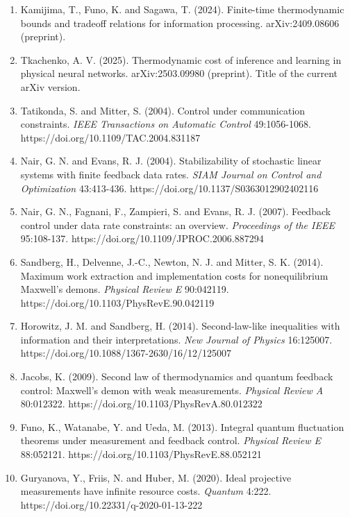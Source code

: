 \documentclass[
  10pt,
]{article}
\newcounter{none} %
\begin{document}
\begin{enumerate}
  Rolandi, A. and Perarnau-Llobet, M. (2023). Finite-time Landauer
  principle beyond weak coupling. \emph{Quantum} 7:1161.
  https://doi.org/10.22331/q-2023-11-03-1161
\item
  Kamijima, T., Funo, K. and Sagawa, T. (2024). Finite-time
  thermodynamic bounds and tradeoff relations for information
  processing. arXiv:2409.08606 (preprint).
\item
  Tkachenko, A. V. (2025). Thermodynamic cost of inference and learning
  in physical neural networks. arXiv:2503.09980 (preprint). Title of the
  current arXiv version.
\item
  Tatikonda, S. and Mitter, S. (2004). Control under communication
  constraints. \emph{IEEE Transactions on Automatic Control}
  49:1056-1068. https://doi.org/10.1109/TAC.2004.831187
\item
  Nair, G. N. and Evans, R. J. (2004). Stabilizability of stochastic
  linear systems with finite feedback data rates. \emph{SIAM Journal on
  Control and Optimization} 43:413-436.
  https://doi.org/10.1137/S0363012902402116
\item
  Nair, G. N., Fagnani, F., Zampieri, S. and Evans, R. J. (2007).
  Feedback control under data rate constraints: an overview.
  \emph{Proceedings of the IEEE} 95:108-137.
  https://doi.org/10.1109/JPROC.2006.887294
\item
  Sandberg, H., Delvenne, J.-C., Newton, N. J. and Mitter, S. K. (2014).
  Maximum work extraction and implementation costs for nonequilibrium
  Maxwell's demons. \emph{Physical Review E} 90:042119.
  https://doi.org/10.1103/PhysRevE.90.042119
\item
  Horowitz, J. M. and Sandberg, H. (2014). Second-law-like inequalities
  with information and their interpretations. \emph{New Journal of
  Physics} 16:125007. https://doi.org/10.1088/1367-2630/16/12/125007
\item
  Jacobs, K. (2009). Second law of thermodynamics and quantum feedback
  control: Maxwell's demon with weak measurements. \emph{Physical Review
  A} 80:012322. https://doi.org/10.1103/PhysRevA.80.012322
\item
  Funo, K., Watanabe, Y. and Ueda, M. (2013). Integral quantum
  fluctuation theorems under measurement and feedback control.
  \emph{Physical Review E} 88:052121.
  https://doi.org/10.1103/PhysRevE.88.052121
\item
  Guryanova, Y., Friis, N. and Huber, M. (2020). Ideal projective
  measurements have infinite resource costs. \emph{Quantum} 4:222.
  https://doi.org/10.22331/q-2020-01-13-222

\end{enumerate}
\end{document}

